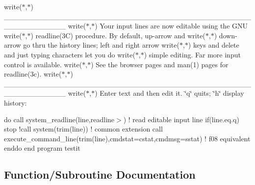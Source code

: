 write($\ast$,$\ast$)\textquotesingle{} \+\_\+\+\_\+\+\_\+\+\_\+\+\_\+\+\_\+\+\_\+\+\_\+\+\_\+\+\_\+\+\_\+\+\_\+\+\_\+\+\_\+\+\_\+\+\_\+\+\_\+\+\_\+\+\_\+\+\_\+\+\_\+\+\_\+\+\_\+\+\_\+\+\_\+\+\_\+\+\_\+\+\_\+\+\_\+\+\_\+\+\_\+\+\_\+\+\_\+\+\_\+\+\_\+\+\_\+\+\_\+\+\_\+\+\_\+\+\_\+\+\_\+\+\_\+\+\_\+\+\_\+\+\_\+\+\_\+\+\_\+\+\_\+\+\_\+\+\_\+\+\_\+\+\_\+\+\_\+\+\_\+\+\_\+\+\_\+\+\_\+\+\_\+\+\_\+\+\_\+\textquotesingle{} write($\ast$,$\ast$)\textquotesingle{} Your input lines are now editable using the G\+NU\textquotesingle{} write($\ast$,$\ast$)\textquotesingle{} readline(3\+C) procedure. By default, up-\/arrow and\textquotesingle{} write($\ast$,$\ast$)\textquotesingle{} down-\/arrow go thru the history lines; left and right arrow\textquotesingle{} write($\ast$,$\ast$)\textquotesingle{} keys and delete and just typing characters let you do\textquotesingle{} write($\ast$,$\ast$)\textquotesingle{} simple editing. Far more input control is available.\textquotesingle{} write($\ast$,$\ast$)\textquotesingle{} See the browser pages and man(1) pages for readline(3c).\textquotesingle{} write($\ast$,$\ast$)\textquotesingle{} \+\_\+\+\_\+\+\_\+\+\_\+\+\_\+\+\_\+\+\_\+\+\_\+\+\_\+\+\_\+\+\_\+\+\_\+\+\_\+\+\_\+\+\_\+\+\_\+\+\_\+\+\_\+\+\_\+\+\_\+\+\_\+\+\_\+\+\_\+\+\_\+\+\_\+\+\_\+\+\_\+\+\_\+\+\_\+\+\_\+\+\_\+\+\_\+\+\_\+\+\_\+\+\_\+\+\_\+\+\_\+\+\_\+\+\_\+\+\_\+\+\_\+\+\_\+\+\_\+\+\_\+\+\_\+\+\_\+\+\_\+\+\_\+\+\_\+\+\_\+\+\_\+\+\_\+\+\_\+\+\_\+\+\_\+\+\_\+\+\_\+\+\_\+\+\_\+\+\_\+\textquotesingle{} write($\ast$,$\ast$)\textquotesingle{} Enter text and then edit it. \char`\"{}q\char`\"{} quits; \char`\"{}h\char`\"{} display history\+:\textquotesingle{}

do call system\+\_\+readline(line,\textquotesingle{}readline$>$\textquotesingle{}) ! read editable input line if(line.\+eq.\textquotesingle{}q\textquotesingle{}) stop !call system(trim(line)) ! common extension call execute\+\_\+command\+\_\+line(trim(line),cmdstat=cstat,cmdmsg=sstat) ! f08 equivalent enddo end program testit 

\subsection{Function/\+Subroutine Documentation}
\mbox{\label{namespacem__readline_a6eae368d34bd43ead64623b2d6d10ae0}} 
